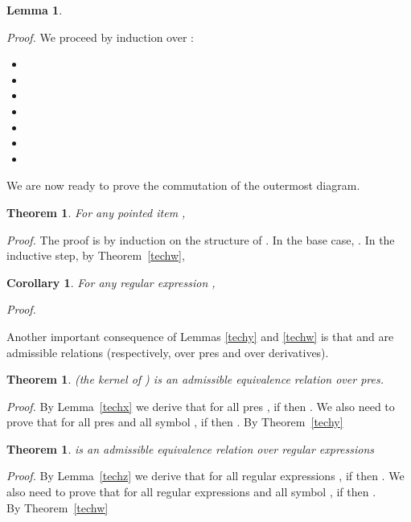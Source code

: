 \documentclass[preprint]{sigplanconf}
\newcounter{item}
\newtheorem{theorem}[item]{Theorem}
\newtheorem{lemma}[item]{Lemma}
\newtheorem{corollary}[item]{Corollary}
\newenvironment{proof}{\begin{trivlist}\item[]{\em Proof.}}{\end{trivlist}}
\begin{document}
\begin{lemma}

\end{lemma}
\begin{proof}
We proceed by induction over :
\begin{itemize}
\item 

\item

\item 
\item 
\item 
\item 
\item 
\end{itemize}
\end{proof}

We are now ready to prove the commutation of the outermost diagram.

\begin{theorem}For any pointed item ,
  
\end{theorem}
\begin{proof}
The proof is by induction on the structure of .
In the base case, . In the inductive step, by Theorem~\ref{techw},

\end{proof}
\begin{corollary}\label{corollary1}
For any regular expression ,

\end{corollary}
\begin{proof}

\end{proof}

Another important consequence of Lemmas \ref{techy} and \ref{techw}
is that  and  are admissible relations (respectively, over
pres and over derivatives).

\begin{theorem}\label{admissible1}
 (the kernel of ) is an admissible
equivalence relation over pres.
\end{theorem}
\begin{proof}
By Lemma~\ref{techx} we derive that for all pres ,
if  then .
We also need to prove that for all pres  and all symbol ,
if  then
. By Theorem~\ref{techy}

\end{proof}

\begin{theorem}\label{admissible2}
 is an admissible equivalence relation over regular
expressions
\end{theorem}
\begin{proof}
By Lemma~\ref{techz} we derive that for all regular expressions ,
if  then .
We also need to prove that for all regular expressions 
and all symbol , if  then
.\\ By Theorem~\ref{techw}

\end{proof}
\end{document}
